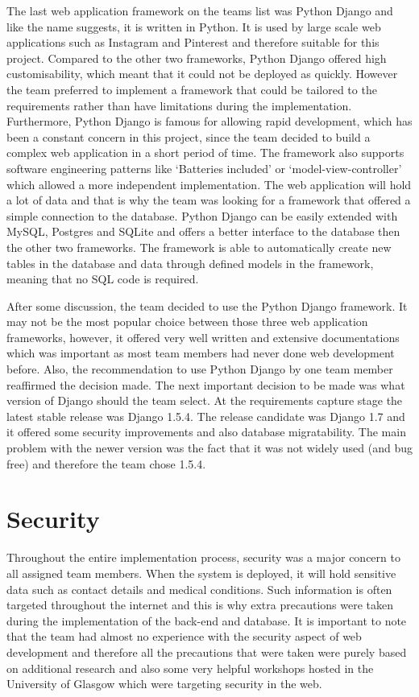 \documentclass{l3proj}
\begin{document}
The last web application framework on the teams list was Python Django and like the name suggests, it is written in Python. It is used by large scale web applications such as Instagram and Pinterest and therefore suitable for this project. Compared to the other two frameworks, Python Django offered high customisability, which meant that it could not be deployed as quickly. However the team preferred to implement a framework that could be tailored to the requirements rather than have limitations during the implementation. Furthermore, Python Django is famous for allowing rapid development, which has been a constant concern in this project, since the team decided to build a complex web application in a short period of time. The framework also supports software engineering patterns like `Batteries included' or `model-view-controller' which allowed a more independent implementation. The web application will hold a lot of data and that is why the team was looking for a framework that offered a simple connection to the database. Python Django can be easily extended with MySQL, Postgres and SQLite and offers a better interface to the database then the other two frameworks. The framework is able to automatically create new tables in the database and data through defined models in the framework, meaning that no SQL code is required.\\
\par 
After some discussion, the team decided to use the Python Django framework. It may not be the most popular choice between those three web application frameworks, however, it offered very well written and extensive documentations which was important as most team members had never done web development before. Also, the recommendation to use Python Django by one team member reaffirmed the decision made. The next important decision to be made was what version of Django should the team select. At the requirements capture stage the latest stable release was Django 1.5.4. The release candidate was Django 1.7 and it offered some security improvements and also database migratability. The main problem with the newer version was the fact that it was not widely used (and bug free) and therefore the team chose 1.5.4. 

\section{Security}
Throughout the entire implementation process, security was a major concern to all assigned team members. When the system is deployed, it will hold sensitive data such as contact details and medical conditions. Such information is often targeted throughout the internet and this is why extra precautions were taken during the implementation of the back-end and database. It is important to note that the team had almost no experience with the security aspect of web development and therefore all the precautions that were taken were purely based on additional research and also some very helpful workshops hosted in the University of Glasgow which were targeting security in the web.\\
\end{document}
